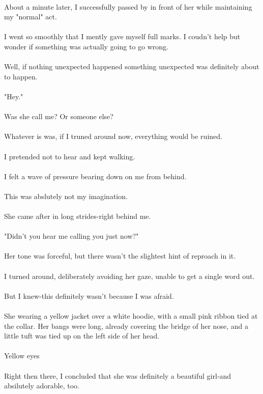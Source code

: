 \documentclass[10pt,a4paper]{article}
\begin{document}
\\
About a minute later, I successfully passed by in front of her while maintaining my "normal" act.
\\
\\
I went so smoothly that I mently gave myself full marks. I coudn't help but wonder if something was actually going to go wrong.
\\
\\
Well, if nothing unexpected happened something unexpected was definitely about to happen.
\\
\\
"Hey."
\\
\\
Was she call me? Or someone else?
\\
\\
Whatever is was, if I truned around now, everything would be ruined.
\\
\\
I pretended not to hear and kept walking.
\\
\\
I felt a wave of pressure bearing down on me from behind.
\\
\\
This was abslutely not my imagination.
\\
\\
She came after in long strides-right behind me.
\\
\\
"Didn't you hear me calling you just now?"
\\
\\
Her tone was forceful, but there wasn't the slightest hint of reproach in it.
\\
\\
I turned around, deliberately avoiding her gaze, unable to get a single word out.
\\
\\
But I knew-this definitely wasn't because I was afraid.
\\
\\
She wearing a yellow jacket over a white hoodie, with a small pink ribbon tied at the collar. Her bangs were long, already covering the bridge of her nose, and a little tuft was tied up on the left side of her head.
\\
\\
Yellow eyes
\\
\\
Right then there, I concluded that she was definitely a beautiful girl-and absilutely adorable, too.
\end{document}
